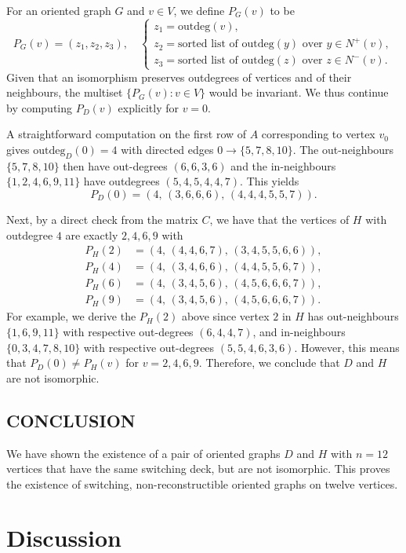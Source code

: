 \documentclass[11pt]{article}
\theoremstyle{definition}
\numberwithin{equation}{section}
\begin{document}
\begin{humanaiblock}
For an oriented graph $G$ and $v \in V$, we define $P_{G}(v)$ to be 
\[
P_{G}(v)=(z_1,z_2,z_3),\quad
\begin{cases}
z_1 = \mathrm{outdeg}(v),\\
z_2 = \text{sorted list of }\mathrm{outdeg}(y)\text{ over }y\in N^+(v),\\
z_3 = \text{sorted list of }\mathrm{outdeg}(z)\text{ over }z\in N^-(v).
\end{cases}
\]
Given that an isomorphism preserves outdegrees of vertices and of their neighbours, the multiset $\{P_G(v):v\in V\}$ would be invariant. We thus continue by computing $P_D(v)$ explicitly for $v=0$. 

A straightforward computation on the first row of $A$ corresponding to vertex $v_0$ gives $\text{outdeg}_D(0) = 4$ with directed edges $0\to\{5,7,8,10\}$. 
The out-neighbours $\{5,7,8,10\}$ then have out-degrees
$(6,6,3,6)$ and the in-neighbours $\{1,2,4,6,9,11\}$ have outdegrees
$(5,4,5,4,4,7)$. This yields
\[
P_D(0) = (4,\,(3,6,6,6),\,(4,4,4,5,5,7)).
\]

Next, by a direct check from the matrix $C$, we have that the vertices of $H$ with
outdegree $4$ are exactly $2,4,6,9$ with 
\begin{align*}
P_H(2) &= (4,\,(4,4,6,7),\,(3,4,5,5,6,6)),\\
P_H(4) &= (4,\,(3,4,6,6),\,(4,4,5,5,6,7)),\\
P_H(6) &= (4,\,(3,4,5,6),\,(4,5,6,6,6,7)),\\
P_H(9) &= (4,\,(3,4,5,6),\,(4,5,6,6,6,7)).
\end{align*}
For example, we derive the $P_H(2)$ above since vertex $2$ in $H$ has out-neighbours $\{1,6,9,11\}$ with respective out-degrees $(6,4,4,7)$, and in-neighbours $\{0,3,4,7,8,10\}$ with respective out-degrees $(5,5,4,6,3,6)$. However, this means that $P_D(0) \neq P_H(v)$ for $v = 2,4,6,9$. Therefore, we conclude that $D$ and $H$ are not isomorphic. 

\subsection*{CONCLUSION}
We have shown the existence of a pair of oriented graphs $D$ and $H$ with $n=12$ vertices that have the same switching deck, but
are not isomorphic. This proves the existence of switching, non-reconstructible oriented graphs on twelve vertices.
\end{humanaiblock}

\section*{Discussion}
\end{document}
